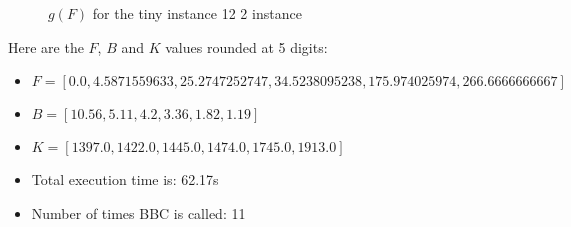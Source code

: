 \documentclass{article}
\begin{document}
\begin{figure}[ht!]
\begin{center}
    \end{center}
    \vspace*{-2eM}
    \caption{$g(F)$ for the tiny instance 12 2 instance}\label{fig:1}
    \end{figure}
    Here are the $F$, $B$ and $K$ values rounded at 5 digits:

\begin{itemize}
	\item  $F = [0.0,4.5871559633,25.2747252747,34.5238095238,175.974025974,266.6666666667]$
 \item $B = [10.56,5.11,4.2,3.36,1.82,1.19]$
 \item  $K = [1397.0,1422.0,1445.0,1474.0,1745.0,1913.0]$\item Total execution time is: 62.17s\item Number of times BBC is called: 11\end{itemize}
\end{document}
